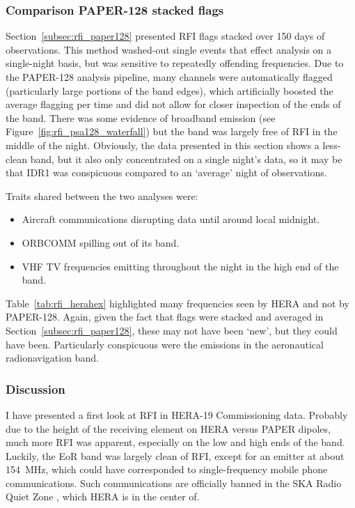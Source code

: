 \subsubsection{Comparison PAPER-128 stacked flags}
Section~\ref{subsec:rfi_paper128} presented RFI flags stacked over 150 days of observations. This method washed-out single events that effect analysis on a single-night basis, but was sensitive to repeatedly offending frequencies. Due to the PAPER-128 analysis pipeline, many channels were automatically flagged (particularly large portions of the band edges), which artificially boosted the average flagging per time and did not allow for closer inspection of the ends of the band. There was some evidence of broadband emission (see Figure~\ref{fig:rfi_psa128_waterfall}) but the band was largely free of RFI in the middle of the night. Obviously, the data presented in this section shows a less-clean band, but it also only concentrated on a single night's data, so it may be that IDR1 was conspicuous compared to an `average' night of observations.

Traits shared between the two analyses were:
\begin{itemize}
\item Aircraft communications disrupting data until around local midnight.
\item ORBCOMM spilling out of its band.
\item VHF TV frequencies emitting throughout the night in the high end of the band.
\end{itemize} 

Table~\ref{tab:rfi_herahex} highlighted many frequencies seen by HERA and not by PAPER-128. Again, given the fact that flags were stacked and averaged in Section~\ref{subsec:rfi_paper128}, these may not have been `new', but they could have been. Particularly conspicuous were the emissions in the aeronautical radionavigation band.

\subsubsection{Discussion}
\label{subsubsec:rfi_herapaper_conc}

I have presented a first look at RFI in HERA-19 Commissioning data. Probably due to the height of the receiving element on HERA versus PAPER dipoles, much more RFI was apparent, especially on the low and high ends of the band. Luckily, the EoR band was largely clean of RFI, except for an emitter at about 154~MHz, which could have corresponded to single-frequency mobile phone communications. Such communications are officially banned in the SKA Radio Quiet Zone \citep{SAKRQZ}, which HERA is in the center of.

